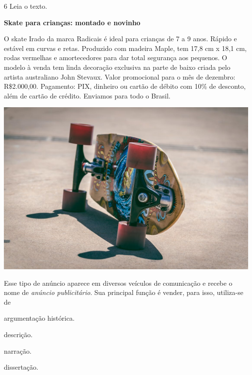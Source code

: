 \num{6} Leia o texto.

\begin{myquote}
\textbf{Skate para crianças: montado e novinho}

O skate Irado da marca Radicais é ideal para crianças de 7 a 9 anos.
Rápido e estável em curvas e retas. Produzido com madeira Maple, tem
17,8 cm x 18,1 cm, rodas vermelhas e amortecedores para dar total
segurança aos pequenos. O modelo à venda tem linda decoração exclusiva
na parte de baixo criada pelo artista australiano John Stevaux. Valor
promocional para o mês de dezembro: R\$2.000,00. Pagamento: PIX,
dinheiro ou cartão de débito com 10\% de desconto, além de cartão de
crédito. Enviamos para todo o Brasil.

\begin{center}
\includegraphics[width=\textwidth]{./media/simulados/image5.png}
\end{center}

\end{myquote}

Esse tipo de anúncio aparece em diversos veículos de comunicação 
e recebe o nome de \emph{anúncio publicitário}. Sua principal função
é vender, para isso, utiliza-se de

\begin{escolha}
\item argumentação histórica.

\item descrição.

\item narração.

\item dissertação.
\end{escolha}


